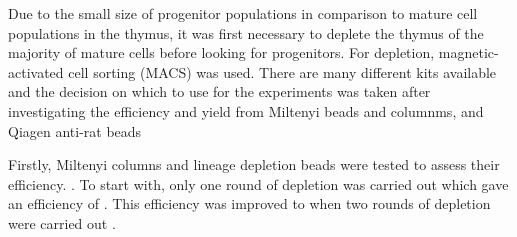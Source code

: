 Due to the small size of progenitor populations in comparison to mature cell populations in the thymus, it was first necessary to deplete the thymus of the majority of mature cells before looking for progenitors.
For depletion, magnetic-activated cell sorting (MACS) was used.
There are many different kits available and the decision on which to use for the experiments was taken after investigating the efficiency and yield from Miltenyi beads and columnms, and Qiagen anti-rat beads 

Firstly, Miltenyi columns and lineage depletion beads were tested to assess their efficiency. 
.
To start with, only one round of depletion was carried out which gave an efficiency of .
This efficiency was improved to  when two rounds of depletion were carried out . 
